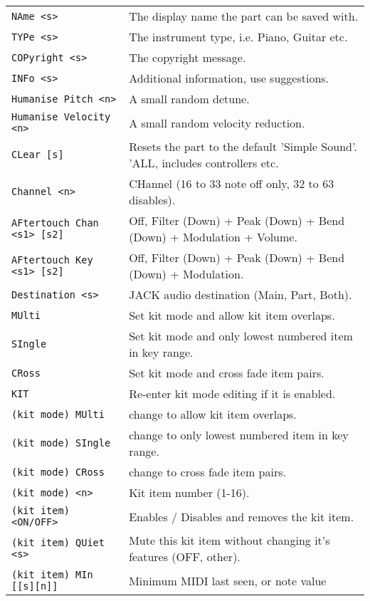 \begin{center}
\begin{longtable}[l]{ ll}
\texttt{NAme <s>} &
   The display name the part can be saved with. \\
\texttt{TYPe <s>} &
   The instrument type, i.e. Piano, Guitar etc. \\
\texttt{COPyright <s>} &
   The copyright message. \\
\texttt{INFo <s>} &
   Additional information, use suggestions. \\
\texttt{Humanise Pitch <n>} &
   A small random detune. \\
\texttt{Humanise Velocity <n>} &
   A small random velocity reduction. \\
\texttt{CLear [s]} &
  Resets the part to the default 'Simple Sound'. 'ALL, includes controllers
  etc. \\
\texttt{Channel <n>} &
   CHannel (16 to 33 note off only, 32 to 63 disables).   \\
\texttt{AFtertouch Chan <s1> [s2]} &
   Off, Filter (Down) + Peak (Down) + Bend (Down) + Modulation + Volume. \\
\texttt{AFtertouch Key <s1> [s2]} &
   Off, Filter (Down) + Peak (Down) + Bend (Down) + Modulation. \\
\texttt{Destination <s>} &
   JACK audio destination (Main, Part, Both).  \\
\texttt{MUlti} &
   Set kit mode and allow kit item overlaps. \\
\texttt{SIngle} &
   Set kit mode and only lowest numbered item in key range. \\
\texttt{CRoss} &
   Set kit mode and cross fade item pairs. \\
\texttt{KIT} &
   Re-enter kit mode editing if it is enabled. \\
   \texttt{(kit mode) MUlti} &
      change to allow kit item overlaps. \\
   \texttt{(kit mode) SIngle} &
      change to only lowest numbered item in key range. \\
   \texttt{(kit mode) CRoss} &
      change to cross fade item pairs. \\
   \texttt{(kit mode) <n>} &
      Kit item number (1-16). \\
   \texttt{(kit item) <ON/OFF>} &
      Enables / Disables and removes the kit item. \\
   \texttt{(kit item) QUiet <s>} &
      Mute this kit item without changing it's features (OFF, {other}). \\
   \texttt{(kit item) MIn [[s][n]]} &
      Minimum MIDI last seen, or note value   \\

\end{longtable}
\end{center}

